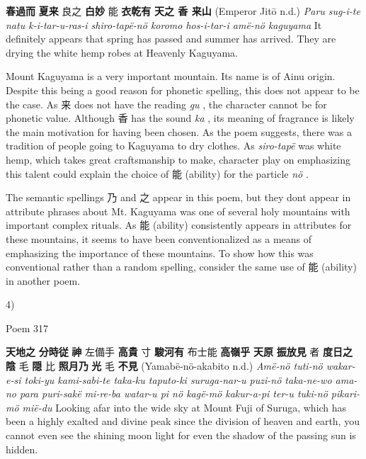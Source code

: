 \par{\textbf{春過而 } \textbf{夏来 }良之  \textbf{白妙 }能  \textbf{衣乾有 } \textbf{天之 香 来山 }(Emperor Jitō n.d.) \hfill\break
\emph{Paru sug-i-te natu k-i-tar-u-ras-i shiro-tapë-nö koromo hos-i-tar-i amë-nö kaguyama \hfill\break
}It definitely appears that spring has passed and summer has arrived. They are drying the white hemp robes at Heavenly Kaguyama. }

\par{ Mount Kaguyama is a very important mountain. Its name is of Ainu origin. Despite this being a good reason for phonetic spelling, this does not appear to be the case. As 来 does not have the reading \emph{gu }, the character cannot be for phonetic value. Although 香 has the sound \emph{ka }, its meaning of fragrance is likely the main motivation for having been chosen. As the poem suggests, there was a tradition of people going to Kaguyama to dry clothes. As \emph{siro-tapë }was white hemp, which takes great craftsmanship to make, character play on emphasizing this talent could explain the choice of 能 (ability) for the particle \emph{nö }. }

\par{ The semantic spellings 乃 and 之 appear in this poem, but they don\textquotesingle t appear in attribute phrases about Mt. Kaguyama was one of several holy mountains with important complex rituals. As 能 (ability) consistently appears in attributes for these mountains, it seems to have been conventionalized as a means of emphasizing the importance of these mountains. To show how this was conventional rather than a random spelling, consider the same use of 能 (ability) in another poem. }

\par{4) }

\par{Poem 317 }

\par{\textbf{天地之 } \textbf{分時従 } \textbf{神 }左備手  \textbf{高貴 }寸  \textbf{駿河有 } 布士能 \textbf{高嶺乎 } \textbf{天原 }\textbf{ }\textbf{振放見 }者  \textbf{度日之 } \textbf{陰 }毛 \textbf{隠 }比  \textbf{照月乃 } \textbf{光 }毛 \textbf{不見 }(Yamabë-nö-akabito n.d.) \hfill\break
\emph{Amë-nö tuti-nö wakar-e-si toki-yu kami-sabi-te taka-ku taputo-ki suruga-nar-u puzi-nö taka-ne-wo ama-no para puri-sakë mi-re-ba watar-u pi nö kagë-mö kakur-a-pi ter-u tuki-nö pikari-mö mië-du \hfill\break
}Looking afar into the wide sky at Mount Fuji of Suruga, which has been a highly exalted and divine peak since the division of heaven and earth, you cannot even see the shining moon light for even the shadow of the passing sun is hidden. }

